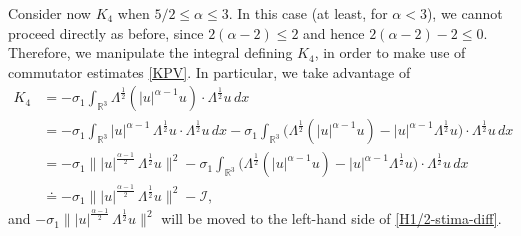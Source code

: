 \documentclass[a4paper]{article}
\newcommand{\dx}{\, dx}
\newcommand{\R}{\mathbb{R}}
\begin{document}
  Consider now $K_4$ when {$5/2 \leq \alpha \le 3$}. In
  this case (at least, for $\alpha<3$), we cannot proceed directly as before, since
  {$2(\alpha-2) \le 2$} and hence {$2(\alpha-2)-2\le 0$}. Therefore, we
  manipulate the integral defining $K_4$, in order to make use of
  commutator estimates \eqref{KPV}.  In particular, we take
  advantage of
  \begin{equation} \label{utility-K4}
    \begin{aligned}
      K_4 &=-\sigma_1 \int_{\R^3}\Lambda^{\frac{1}{2}}(|u|^{\alpha-1}u)\cdot
      \Lambda^{\frac{1}{2}} u \dx
      \\
      &=-\sigma_1 \int_{\mathbb R^3}|u|^{\alpha-1}\, \Lambda^\frac12
      u\cdot \Lambda^\frac12 u\, dx -
      \sigma_1\int_{\R^3}\Big(\Lambda^{\frac{1}{2}}(|u|^{\alpha-1}u) -
      |u|^{\alpha-1}\Lambda^\frac12 u \Big)\cdot \Lambda^\frac12 u\dx
      \\
      &=-\sigma_1\||u|^{\frac{\alpha-1}{2}}\, \Lambda^\frac12 u\|^2
      -\sigma_1\int_{\R^3}\Big(\Lambda^{\frac{1}{2}}(|u|^{\alpha-1}u)
      - |u|^{\alpha-1}\Lambda^\frac12 u \Big)\cdot \Lambda^\frac12
      u\dx
      \\
      &\doteq -\sigma_1\||u|^{\frac{\alpha-1}{2}}\, \Lambda^\frac12 u\|^2 -
      \mathcal I,
    \end{aligned}
  \end{equation}
  and $-\sigma_1\||u|^{\frac{\alpha-1}{2}}\, \Lambda^\frac12 u\|^2$
  will be moved to the left-hand side of \eqref{H1/2-stima-diff}.
\end{document}
